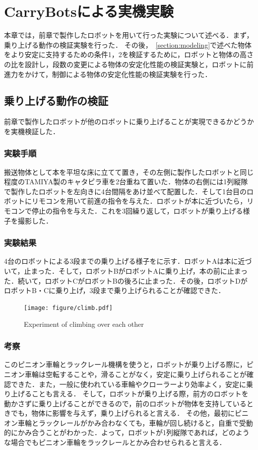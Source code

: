 \chapter{CarryBotsによる実機実験}
本章では，前章で製作したロボットを用いて行った実験について述べる．まず，乗り上げる動作の検証実験を行った．
その後，~\ref{section:modeling}で述べた物体をより安定に支持するための条件1，2を検証するために，ロボットと物体の高さの比を設計し，段数の変更による物体の安定化性能の検証実験と，ロボットに前進力をかけて，制御による物体の安定化性能の検証実験を行った．

\section{乗り上げる動作の検証}
前章で製作したロボットが他のロボットに乗り上げることが実現できるかどうかを実機検証した．

\subsection{実験手順}
搬送物体として本を平坦な床に立てて置き，その左側に製作したロボットと同じ程度のTAMIYA製のキャタピラ車を2台重ねて置いた．物体の右側には1列縦隊で製作したロボットを左向きに4台間隔をあけ並べて配置した．そして1台目のロボットにリモコンを用いて前進の指令を与えた．ロボットが本に近づいたら，リモコンで停止の指令を与えた．これを3回繰り返して，ロボットが乗り上げる様子を撮影した．

\subsection{実験結果}
4台のロボットによる3段までの乗り上げる様子をに示す．ロボットAは本に近づいて，止まった．そして，ロボットBがロボットAに乗り上げ，本の前に止まった．続いて，ロボットCがロボットBの後ろに止まった．その後，ロボットDがロボットB・Cに乗り上げ，3段まで乗り上げられることが確認できた．

\begin{figure}[tb]
  \centering
  \texttt{[image: figure/climb.pdf]}
  \caption{Experiment of climbing over each other}
  \label{fig:climb}
\end{figure}

\subsection{考察}
このピニオン車輪とラックレール機構を使うと，ロボットが乗り上げる際に，ピニオン車輪は空転することや，滑ることがなく，安定に乗り上げられることが確認できた．また，一般に使われている車輪やクローラーより効率よく，安定に乗り上げることも言える．
そして，ロボットが乗り上げる際，前方のロボットを動かさずに乗り上げることができるので，前のロボットが物体を支持しているときでも，物体に影響を与えず，乗り上げられると言える．
その他，最初にピニオン車輪とラックレールがかみ合わなくても，車輪が回し続けると，自重で受動的にかみ合うことがわかった．よって，ロボットが1列縦隊であれば，どのような場合でもピニオン車輪をラックレールとかみ合わせられると言える．

